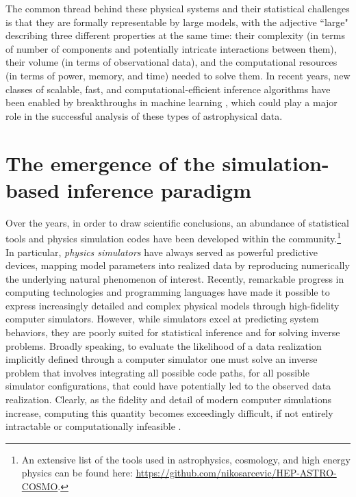 The common thread behind these physical systems and their statistical challenges is that they are formally representable by large models, with the adjective ``large" describing three different properties at the same time: their complexity (in terms of number of components and potentially intricate interactions between them), their volume (in terms of observational data), and the computational resources (in terms of power, memory, and time) needed to solve them. In recent years, new classes of scalable, fast, and computational-efficient inference algorithms have been enabled by breakthroughs in machine learning \cite{Murphy:book}, which could play a major role in the successful analysis of these types of astrophysical data.


\clearpage
\section{The emergence of the simulation-based inference paradigm} \label{sec:paradigm}

Over the years, in order to draw scientific conclusions, an abundance of statistical tools and physics simulation codes have been developed within the community.\footnote{An extensive list of the tools used in astrophysics, cosmology, and high energy physics can be found here: \url{https://github.com/nikosarcevic/HEP-ASTRO-COSMO}.}
In particular, \emph{physics simulators} have always served as powerful predictive devices, mapping model parameters into realized data by reproducing numerically the underlying natural phenomenon of interest.
Recently, remarkable progress in computing technologies and programming languages have made it possible to express increasingly detailed and complex physical models through high-fidelity computer simulators. However, while simulators excel at predicting system behaviors, they are poorly suited for statistical inference and for solving inverse problems. 
Broadly speaking, to evaluate the likelihood of a data realization implicitly defined through a computer simulator one must solve an inverse problem that involves integrating all possible code paths, for all possible simulator configurations, that could have potentially led to the observed data realization. Clearly, as the fidelity and detail of modern computer simulations increase, computing this quantity becomes exceedingly difficult, if not entirely intractable or computationally infeasible  \cite{Cranmer:2019eaq}. 

